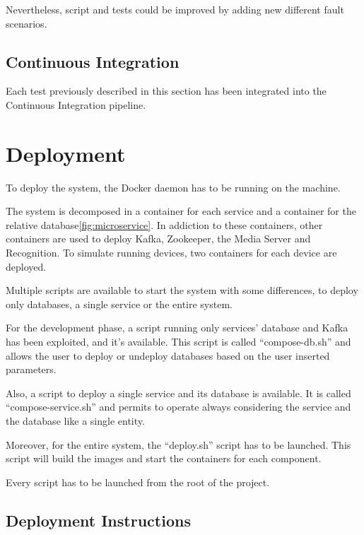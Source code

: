 \documentclass{scrartcl}
\begin{document}
    Nevertheless, script and tests could be improved by adding new different fault scenarios.

    

    \subsection{Continuous Integration}\label{subsec:continuous-integration}

    Each test previously described in this section has been integrated into the Continuous Integration pipeline.

    \section{Deployment}
    To deploy the system, the Docker daemon has to be running on the machine.

    The system is decomposed in a container for each service and a container for the relative database\ref{fig:microservice}.
    In addiction to these containers, other containers are used to deploy Kafka, Zookeeper, the Media Server and Recognition.
    To simulate running devices, two containers for each device are deployed.

    Multiple scripts are available to start the system with some differences, to deploy only databases, a single service or the entire system.

    For the development phase, a script running only services' database and Kafka has been exploited, and it's available.
    This script is called ``compose-db.sh'' and allows the user to deploy or undeploy databases based on the user inserted parameters.

    Also, a script to deploy a single service and its database is available.
    It is called ``compose-service.sh'' and permits to operate always considering the service and the database like a single entity.

    Moreover, for the entire system, the ``deploy.sh'' script has to be launched.
    This script will build the images and start the containers for each component.

    Every script has to be launched from the root of the project.

    \subsection{Deployment Instructions}
\end{document}
